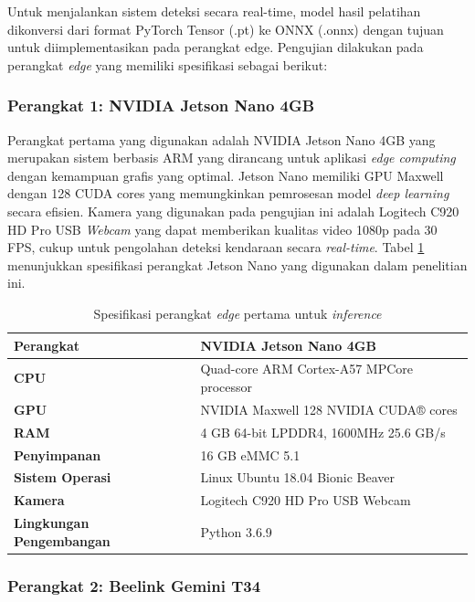 Untuk menjalankan sistem deteksi secara real-time, model hasil pelatihan dikonversi dari format PyTorch Tensor (.pt) ke ONNX (.onnx) dengan tujuan untuk diimplementasikan pada perangkat edge. Pengujian dilakukan pada perangkat \emph{edge} yang memiliki spesifikasi sebagai berikut:

\subsubsection{Perangkat 1: NVIDIA Jetson Nano 4GB}

Perangkat pertama yang digunakan adalah NVIDIA Jetson Nano 4GB yang merupakan sistem berbasis ARM yang dirancang untuk aplikasi \emph{edge computing} dengan kemampuan grafis yang optimal. Jetson Nano memiliki GPU Maxwell dengan 128 CUDA cores yang memungkinkan pemrosesan model \emph{deep learning} secara efisien. Kamera yang digunakan pada pengujian ini adalah Logitech C920 HD Pro USB \emph{Webcam} yang dapat memberikan kualitas video 1080p pada 30 FPS, cukup untuk pengolahan deteksi kendaraan secara \emph{real-time}. Tabel \ref{tab:jetson_nano_specs} menunjukkan spesifikasi perangkat Jetson Nano yang digunakan dalam penelitian ini.

\begin{table}[htbp]
  \centering
  \begin{tabular}{|l|l|}
  \hline
  \textbf{Perangkat} & NVIDIA Jetson Nano 4GB \\
  \hline
  \textbf{CPU} & Quad-core ARM Cortex-A57 MPCore processor \\
  \hline
  \textbf{GPU} & NVIDIA Maxwell 128 NVIDIA CUDA® cores \\
  \hline
  \textbf{RAM} & 4 GB 64-bit LPDDR4, 1600MHz 25.6 GB/s \\
  \hline
  \textbf{Penyimpanan} & 16 GB eMMC 5.1 \\
  \hline
  \textbf{Sistem Operasi} & Linux Ubuntu 18.04 Bionic Beaver \\
  \hline
  \textbf{Kamera} & Logitech C920 HD Pro USB Webcam \\
  \hline
  \textbf{Lingkungan Pengembangan} & Python 3.6.9 \\
  \hline
  \end{tabular}
  \caption{Spesifikasi perangkat \emph{edge} pertama untuk \emph{inference}}
  \label{tab:jetson_nano_specs}
\end{table}

\subsubsection{Perangkat 2: Beelink Gemini T34}


